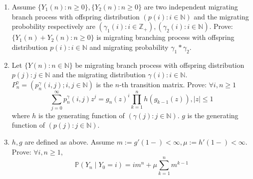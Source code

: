 \documentclass{ctexart}
\newif\ifpreface
\begin{document}
\large
\setlength{\baselineskip}{1.2em}
\ifpreface
  
\else
\fi
{}
\begin{problem}\label{pro:1}
  \begin{enumerate}
    \item Assume \(\{Y_1(n):n \geq 0\}, \{Y_2(n):n \geq 0\}\) are two independent migrating branch process with
      offspring distribution \((p(i):i \in \mathbb{N})\) and the migrating probobility respectively
      are \((\gamma_1(i): i \in \mathbb{Z}_{+}),(\gamma_2(i): i \in \mathbb{N})\).
      Prove: \(\{Y_1(n )+ Y_2(n): n \geq 0\}\) is migrating branching process with
      offspring distribution \(p(i): i \in \mathbb{N}\)
      and migrating probability \(\gamma_1 * \gamma_2\).
    \item Let \(\{Y(n): n \in \mathbb{N}\}\) be migrating branch process with offspring distribution \(p(j): j \in \mathbb{N}\)
      and the migrating distribution \(\gamma(i): i \in \mathbb{N}\).
      \(P_n^\gamma=(p_n^\gamma (i,j); i,j \in \mathbb{N})\) is the \(n\)-th transition matrix.
      Prove: \(\forall i,n \geq 1\)
      \[
        \sum_{j=0}^{\infty} p_n^\gamma(i,j)z^j = g_n(z)^i \prod_{k=1}^{n} h(g_{k-1}(z)), |z| \leq 1
      \]
      where \(h\) is the generating function of \((\gamma(j): j \in \mathbb{N})\).
      \(g\) is the generating function of \((p(j): j \in \mathbb{N})\).
    \item \(h,g\) are defined as above. Assume \(m :=g'(1-) < \infty, \mu:=h'(1-) < \infty\).
      Prove: \(\forall i,n \geq 1\), \[
        \mathbb{P}(Y_n \mid Y_0 =i)=im^n + \mu \sum_{k=1}^{n} m^{k-1}
      \]
  \end{enumerate}
\end{problem}
\end{document}
